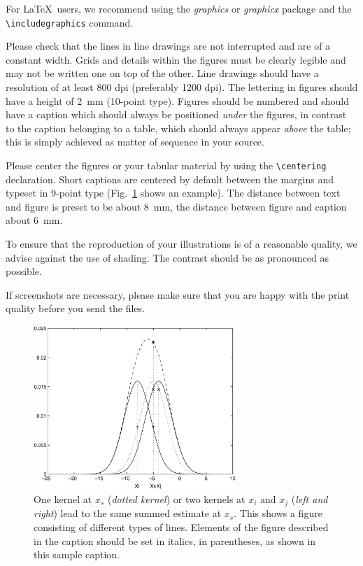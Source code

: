 \documentclass[runningheads,a4paper]{llncs}
\begin{document}
For \LaTeX\ users, we recommend using the \emph{graphics} or \emph{graphicx}
package and the \verb+\includegraphics+ command.

Please check that the lines in line drawings are not
interrupted and are of a constant width. Grids and details within the
figures must be clearly legible and may not be written one on top of
the other. Line drawings should have a resolution of at least 800 dpi
(preferably 1200 dpi). The lettering in figures should have a height of
2~mm (10-point type). Figures should be numbered and should have a
caption which should always be positioned \emph{under} the figures, in
contrast to the caption belonging to a table, which should always appear
\emph{above} the table; this is simply achieved as matter of sequence in
your source.

Please center the figures or your tabular material by using the \verb+\centering+
declaration. Short captions are centered by default between the margins
and typeset in 9-point type (Fig.~\ref{fig:example} shows an example).
The distance between text and figure is preset to be about 8~mm, the
distance between figure and caption about 6~mm.

To ensure that the reproduction of your illustrations is of a reasonable
quality, we advise against the use of shading. The contrast should be as
pronounced as possible.

If screenshots are necessary, please make sure that you are happy with
the print quality before you send the files.
\begin{figure}
\centering
\includegraphics[height=6.2cm]{eijkel2}
\caption{One kernel at $x_s$ (\emph{dotted kernel}) or two kernels at
$x_i$ and $x_j$ (\textit{left and right}) lead to the same summed estimate
at $x_s$. This shows a figure consisting of different types of
lines. Elements of the figure described in the caption should be set in
italics, in parentheses, as shown in this sample caption.}
\label{fig:example}
\end{figure}
\end{document}
